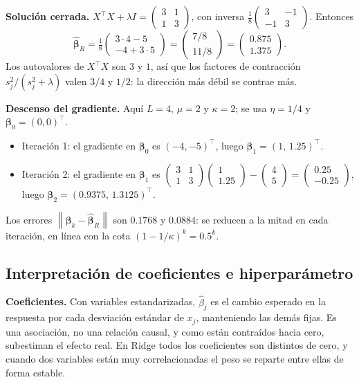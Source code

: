 \documentclass[11pt,a4paper]{article}
\newcommand{\norm}[1]{\left\lVert #1 \right\rVert}
\newcommand{\bt}{\bm{\beta}}
\newcommand{\bh}{\hat{\bm{\beta}}}
\theoremstyle{simple}
\begin{document}
\textbf{Solución cerrada.} $X^\top X+\lambda I=\begin{pmatrix}3&1\\1&3\end{pmatrix}$, con inversa $\tfrac18\begin{pmatrix}3&-1\\-1&3\end{pmatrix}$. Entonces
\[
\bh_R=\tfrac18\begin{pmatrix}3\cdot4-5\\-4+3\cdot5\end{pmatrix}=\begin{pmatrix}7/8\\11/8\end{pmatrix}=\begin{pmatrix}0.875\\1.375\end{pmatrix}.
\]
Los autovalores de $X^\top X$ son $3$ y $1$, así que los factores de contracción $s_j^2/(s_j^2+\lambda)$ valen $3/4$ y $1/2$: la dirección más débil se contrae más.

\textbf{Descenso del gradiente.} Aquí $L=4$, $\mu=2$ y $\kappa=2$; se usa $\eta=1/4$ y $\bt_0=(0,0)^\top$.
\begin{itemize}
\item Iteración 1: el gradiente en $\bt_0$ es $(-4,-5)^\top$, luego $\bt_1=(1,\,1.25)^\top$.
\item Iteración 2: el gradiente en $\bt_1$ es $\begin{pmatrix}3&1\\1&3\end{pmatrix}\!\begin{pmatrix}1\\1.25\end{pmatrix}-\begin{pmatrix}4\\5\end{pmatrix}=\begin{pmatrix}0.25\\-0.25\end{pmatrix}$, luego $\bt_2=(0.9375,\,1.3125)^\top$.
\end{itemize}
Los errores $\norm{\bt_k-\bh_R}$ son $0.1768$ y $0.0884$: se reducen a la mitad en cada iteración, en línea con la cota $(1-1/\kappa)^k=0.5^k$.

\subsection{Interpretación de coeficientes e hiperparámetro}
\textbf{Coeficientes.} Con variables estandarizadas, $\hat\beta_j$ es el cambio esperado en la respuesta por cada desviación estándar de $x_j$, manteniendo las demás fijas. Es una asociación, no una relación causal, y como están contraídos hacia cero, subestiman el efecto real. En Ridge todos los coeficientes son distintos de cero, y cuando dos variables están muy correlacionadas el peso se reparte entre ellas de forma estable.
\end{document}
